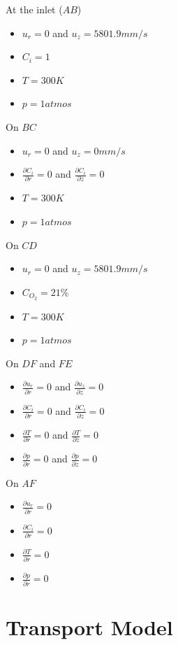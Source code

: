 \noindent At the inlet ($AB$)
\begin{itemize}
\item $u_r = 0$ and $u_z=5801.9 mm/s$
\item $C_i = 1$ 
\item $T = 300K$
\item $p=1 atmos$
\end{itemize}

\bigskip 
\noindent On $BC$
\begin{itemize}
\item $u_r = 0$ and $u_z=0 mm/s$
\item $\frac{\partial C_i}{\partial r} =0 $ and $\frac{\partial C_i}{\partial z} =0 $
\item $T = 300K$
\item $p=1 atmos$
\end{itemize}

\noindent On $CD$
\begin{itemize}
\item $u_r = 0$ and $u_z=5801.9 mm/s$
\item $ C_{O_2} =21 \% $
\item $T = 300K$
\item $p=1 atmos$
\end{itemize}

\noindent On $DF$ and $FE$
\begin{itemize}
\item $\frac{\partial u_r}{\partial r} =0 $ and $\frac{\partial u_z}{\partial z} =0 $
\item $\frac{\partial C_i}{\partial r} =0 $ and $\frac{\partial C_i}{\partial z} =0 $
\item $\frac{\partial T}{\partial r} =0 $ and $\frac{\partial T}{\partial z} =0 $
\item $\frac{\partial p}{\partial r} =0 $ and $\frac{\partial p}{\partial z} =0 $
\end{itemize}


\noindent On $AF$
\begin{itemize}
\item $\frac{\partial u_r}{\partial r} =0 $ 
\item $\frac{\partial C_i}{\partial r} =0 $ 
\item $\frac{\partial T}{\partial r} =0 $  
\item $\frac{\partial p}{\partial r} =0 $
\end{itemize}

\section{Transport Model}
